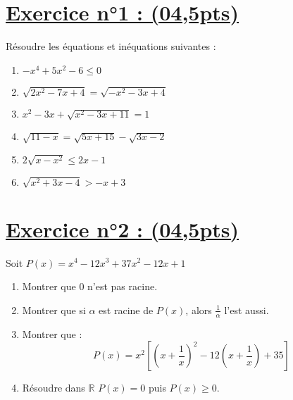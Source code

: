 \documentclass[12pt,a4paper]{article}
\begin{document}
\renewcommand{\arraystretch}{1.5}
\renewcommand{\arrayrulewidth}{1.2pt}
\vspace{3cm}
\section*{\underline{Exercice n°1 : (04,5pts)}}
Résoudre les équations et inéquations suivantes :
\begin{enumerate}
    \item $-x^4 + 5x^2 - 6 \leq 0$
    \item $\sqrt{2x^2 - 7x + 4} = \sqrt{-x^2 - 3x + 4}$
    \item $x^2 - 3x + \sqrt{x^2 - 3x + 11} = 1$
    \item $\sqrt{11 - x} = \sqrt{5x + 15} - \sqrt{3x - 2}$
    \item $2\sqrt{x - x^2} \leq 2x - 1$
    \item $\sqrt{x^2 + 3x - 4} > -x + 3$
\end{enumerate}
\section*{\underline{Exercice n°2 : (04,5pts)}}

Soit $P(x) = x^4 - 12x^3 + 37x^2 - 12x + 1$
\begin{enumerate}
    \item Montrer que $0$ n'est pas racine.
    \item Montrer que si $\alpha$ est racine de $P(x)$, alors $\frac{1}{\alpha}$ l'est aussi.
    \item Montrer que :
    \[
    P(x) = x^2 \left[ \left( x + \frac{1}{x} \right)^2 - 12 \left( x + \frac{1}{x} \right) + 35 \right]
    \]
    \item Résoudre dans $\mathbb{R}$ $P(x) = 0$ puis $P(x) \geq 0$.
\end{enumerate}
\end{document}
